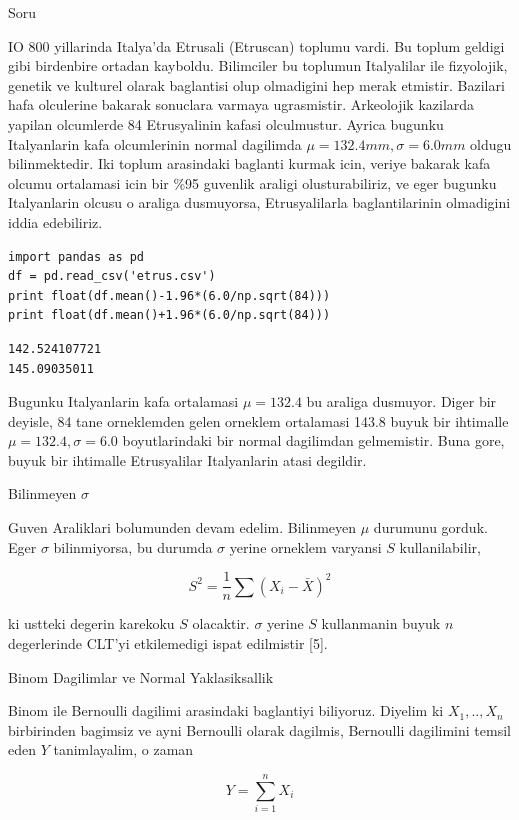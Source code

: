 \documentclass[12pt,fleqn]{article}\usepackage{../common}
\begin{document}
Soru

IO 800 yillarinda Italya'da Etrusali (Etruscan) toplumu vardi. Bu toplum
geldigi gibi birdenbire ortadan kayboldu. Bilimciler bu toplumun
Italyalilar ile fizyolojik, genetik ve kulturel olarak baglantisi olup
olmadigini hep merak etmistir. Bazilari hafa olculerine bakarak sonuclara
varmaya ugrasmistir. Arkeolojik kazilarda yapilan olcumlerde 84
Etrusyalinin kafasi olculmustur. Ayrica bugunku Italyanlarin kafa
olcumlerinin normal dagilimda $\mu=132.4 mm,\sigma=6.0mm$ oldugu
bilinmektedir. Iki toplum arasindaki baglanti kurmak icin, veriye bakarak
kafa olcumu ortalamasi icin bir \%95 guvenlik araligi olusturabiliriz, ve
eger bugunku Italyanlarin olcusu o araliga dusmuyorsa, Etrusyalilarla
baglantilarinin olmadigini iddia edebiliriz.

\begin{verbatim}
import pandas as pd
df = pd.read_csv('etrus.csv')
print float(df.mean()-1.96*(6.0/np.sqrt(84)))
print float(df.mean()+1.96*(6.0/np.sqrt(84)))
\end{verbatim}

\begin{verbatim}
142.524107721
145.09035011
\end{verbatim}

Bugunku Italyanlarin kafa ortalamasi $\mu=132.4$ bu araliga dusmuyor. Diger
bir deyisle, 84 tane orneklemden gelen orneklem ortalamasi 143.8 buyuk bir
ihtimalle $\mu=132.4,\sigma=6.0$ boyutlarindaki bir normal dagilimdan
gelmemistir. Buna gore, buyuk bir ihtimalle Etrusyalilar Italyanlarin atasi
degildir. 

Bilinmeyen $\sigma$

Guven Araliklari bolumunden devam edelim. Bilinmeyen $\mu$ durumunu
gorduk. Eger $\sigma$ bilinmiyorsa, bu durumda $\sigma$ yerine orneklem
varyansi $S$ kullanilabilir,

$$ S^2 = \frac{1}{n} \sum (X_i - \bar{X})^2
$$

ki ustteki degerin karekoku $S$ olacaktir. $\sigma$ yerine $S$ kullanmanin 
buyuk $n$ degerlerinde CLT'yi etkilemedigi ispat edilmistir [5]. 


Binom Dagilimlar ve Normal Yaklasiksallik

Binom ile Bernoulli dagilimi arasindaki baglantiyi biliyoruz. Diyelim ki
$X_1,..,X_n$ birbirinden bagimsiz ve ayni Bernoulli olarak dagilmis,
Bernoulli dagilimini temsil eden $Y$ tanimlayalim, o zaman

$$ Y = \sum_{i=1}^n X_i $$
\end{document}
